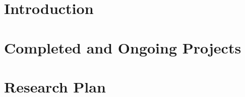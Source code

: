 \documentclass[11pt, a4paper]{report}
\begin{document}
    
    
    \tableofcontents
    \newpage

    \chapter{Introduction}
    
    
    

    \chapter{Completed and Ongoing Projects}
    
    
    
    
    

    \chapter{Research Plan}
    
    
    
    
    
    
    

    \newpage
    
    
\end{document}
